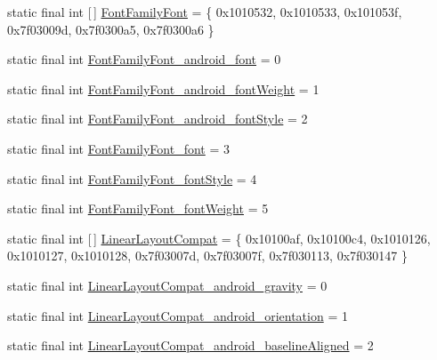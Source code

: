 \begin{DoxyCompactItemize}
static final int \mbox{[}$\,$\mbox{]} \mbox{\hyperlink{classandroid_1_1support_1_1v7_1_1appcompat_1_1_r_1_1styleable_a1f963633c060aeae0010f3d9d21be0d9}{Font\+Family\+Font}} = \{ 0x1010532, 0x1010533, 0x101053f, 0x7f03009d, 0x7f0300a5, 0x7f0300a6 \}
\item 
static final int \mbox{\hyperlink{classandroid_1_1support_1_1v7_1_1appcompat_1_1_r_1_1styleable_ad9902a78d692f92e22f85cf6a8c42470}{Font\+Family\+Font\+\_\+android\+\_\+font}} = 0
\item 
static final int \mbox{\hyperlink{classandroid_1_1support_1_1v7_1_1appcompat_1_1_r_1_1styleable_ac0946f34d4fd72d043287477e13617ff}{Font\+Family\+Font\+\_\+android\+\_\+font\+Weight}} = 1
\item 
static final int \mbox{\hyperlink{classandroid_1_1support_1_1v7_1_1appcompat_1_1_r_1_1styleable_a3f4fc2047207b2c4da8bbf76d1a0d004}{Font\+Family\+Font\+\_\+android\+\_\+font\+Style}} = 2
\item 
static final int \mbox{\hyperlink{classandroid_1_1support_1_1v7_1_1appcompat_1_1_r_1_1styleable_ab8d3ad7dacf5b910fe3c786a0eff7871}{Font\+Family\+Font\+\_\+font}} = 3
\item 
static final int \mbox{\hyperlink{classandroid_1_1support_1_1v7_1_1appcompat_1_1_r_1_1styleable_a87b0431997ee6431543e190e93be3ce3}{Font\+Family\+Font\+\_\+font\+Style}} = 4
\item 
static final int \mbox{\hyperlink{classandroid_1_1support_1_1v7_1_1appcompat_1_1_r_1_1styleable_ac04ef33c0a0ab5c32746bbdd106b4f72}{Font\+Family\+Font\+\_\+font\+Weight}} = 5
\item 
static final int \mbox{[}$\,$\mbox{]} \mbox{\hyperlink{classandroid_1_1support_1_1v7_1_1appcompat_1_1_r_1_1styleable_a765d32873526b8c36de14b184094582d}{Linear\+Layout\+Compat}} = \{ 0x10100af, 0x10100c4, 0x1010126, 0x1010127, 0x1010128, 0x7f03007d, 0x7f03007f, 0x7f030113, 0x7f030147 \}
\item 
static final int \mbox{\hyperlink{classandroid_1_1support_1_1v7_1_1appcompat_1_1_r_1_1styleable_a202f5756f9ea1f3e59f081f08504f7cc}{Linear\+Layout\+Compat\+\_\+android\+\_\+gravity}} = 0
\item 
static final int \mbox{\hyperlink{classandroid_1_1support_1_1v7_1_1appcompat_1_1_r_1_1styleable_aa0018fb5f7ace994511fa780754a9bde}{Linear\+Layout\+Compat\+\_\+android\+\_\+orientation}} = 1
\item 
static final int \mbox{\hyperlink{classandroid_1_1support_1_1v7_1_1appcompat_1_1_r_1_1styleable_a1839a26136f1f9ec79878c1035eebed9}{Linear\+Layout\+Compat\+\_\+android\+\_\+baseline\+Aligned}} = 2

\end{DoxyCompactItemize}
